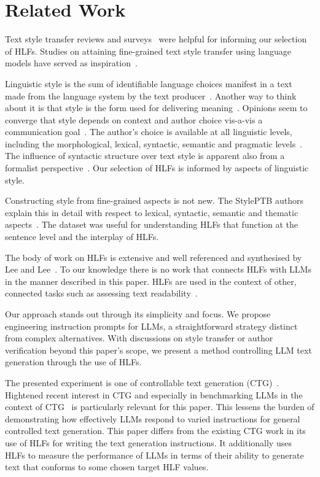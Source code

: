 \documentclass[11pt]{article}
\begin{document}
\section{Related Work}\label{related}

Text style transfer reviews and surveys~\cite{tst-review-2021,tst-survey-2022}
were helpful for informing our selection of HLFs.
Studies on attaining fine-grained text style transfer using language models
have served as inspiration~\cite{lyu-etal-2023-fine}.

Linguistic style is the sum of identifiable language choices manifest in a text
made from the language system by the text producer~\cite{lugea2023stylistics}.
Another way to think about it is that style is the form used for delivering
meaning~\cite{tst_sigkdd_review_2022}.
Opinions seem to converge that style depends on context and author choice
vis-a-vis a communication goal~\cite{mcdonald1985computational,hovy1987generating}.
The author's choice is available at all linguistic levels, including the
morphological, lexical, syntactic, semantic and pragmatic
levels~\cite{dimarco1994model,lugea2023stylistics}.
The influence of syntactic structure over text style is apparent also from a
formalist perspective~\cite{chomsky2002syntactic}.
Our selection of HLFs is informed by aspects of linguistic style.

Constructing style from fine-grained aspects is not new.
The StylePTB authors explain this in detail with respect to lexical,
syntactic, semantic and thematic aspects~\cite{lyu-etal-2021-styleptb}.
The dataset was useful for understanding HLFs that function at the sentence
level and the interplay of HLFs.

The body of work on HLFs is extensive and well referenced and synthesised by
Lee and Lee~\cite{lftk-2023}.
To our knowledge there is no work that connects HLFs with LLMs in the manner
described in this paper.
HLFs are used in the context of other, connected tasks such as assessing text
readability~\cite{lee-etal-2021-pushing}.

Our approach stands out through its simplicity and focus.
We propose engineering instruction prompts for LLMs, a straightforward strategy
distinct from complex alternatives.
With discussions on style transfer or author verification beyond this paper's
scope, we present a method controlling LLM text generation through the use of
HLFs.

The presented experiment is one of controllable text
generation (CTG)~\cite{zhang-ctg-2022}.
Hightened recent interest in CTG and especially in benchmarking LLMs in the
context of CTG~\cite{chen2024benchmarking} is particularly relevant for this
paper.
This lessens the burden of demonstrating how effectively LLMs respond to varied
instructions for general controlled text generation.
This paper differs from the existing CTG work in its use of HLFs for writing
the text generation instructions.
It additionally uses HLFs to measure the performance of LLMs in terms of their
ability to generate text that conforms to some chosen target HLF values.
\end{document}
